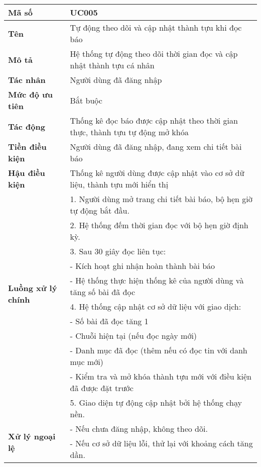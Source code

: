 \begingroup
\renewcommand{\arraystretch}{1.1}
\small
\centering
\noindent
\begin{minipage}{\textwidth}
    \centering
    \begin{tabular}{|m{3cm}|m{9cm}|}
        \hline
        \textbf{Mã số}  & UC005 \\
        \hline
        \textbf{Tên}  & Tự động theo dõi và cập nhật thành tựu khi đọc báo \\
        \hline
        \textbf{Mô tả}  & Hệ thống tự động theo dõi thời gian đọc và cập nhật thành tựu cá nhân \\
        \hline
        \textbf{Tác nhân}  & Người dùng đã đăng nhập \\
        \hline
        \textbf{Mức độ ưu tiên}  & Bắt buộc \\
        \hline
        \textbf{Tác động}  & Thống kê đọc báo được cập nhật theo thời gian thực, thành tựu tự động mở khóa \\
        \hline
        \textbf{Tiền điều kiện}  & Người dùng đã đăng nhập, đang xem chi tiết bài báo \\
        \hline
        \textbf{Hậu điều kiện}  & Thống kê người dùng được cập nhật vào cơ sở dữ liệu, thành tựu mới hiển thị \\
        \hline
        \multirow{10}{*}{\textbf{Luồng xử lý chính}}
            & 1. Người dùng mở trang chi tiết bài báo, bộ hẹn giờ tự động bắt đầu. \\
            & 2. Hệ thống đếm thời gian đọc với bộ hẹn giờ định kỳ. \\
            & 3. Sau 30 giây đọc liên tục: \\
            & - Kích hoạt ghi nhận hoàn thành bài báo \\
            & - Hệ thống thực hiện thống kê của người dùng và tăng số bài đã đọc \\
            & 4. Hệ thống cập nhật cơ sở dữ liệu với giao dịch: \\
            & - Số bài đã đọc tăng 1 \\
            & - Chuỗi hiện tại (nếu đọc ngày mới) \\
            & - Danh mục đã đọc (thêm nếu có đọc tin với danh mục mới) \\
            & - Kiểm tra và mở khóa thành tựu mới với điều kiện đã được đặt trước \\
            & 5. Giao diện tự động cập nhật bởi hệ thống chạy nền. \\
        \hline
        \multirow{2}{*}{\textbf{Xử lý ngoại lệ}}
            & - Nếu chưa đăng nhập, không theo dõi. \\
            & - Nếu cơ sở dữ liệu lỗi, thử lại với khoảng cách tăng dần. \\
        \hline
    \end{tabular}
\end{minipage}
\endgroup


